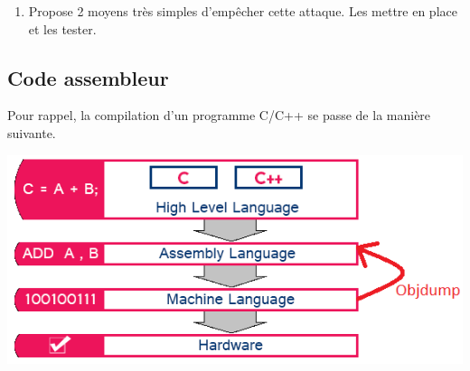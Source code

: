 \documentclass[french, 12pt]{article}%
\newcommand{\itemE}{\item[$\bullet$]}
\newif\ifPROF
\begin{document}
\ifPROF
\color{red}
\paragraph{Correction }

Il faut mettre 10 caratéres inutiles dans le login les 4 octets suivants vont écraser la varaible authentification. Attention à l'ordre des octets

\begin{lstlisting}[style=commande]
$ echo $(printf 'pppppppppp\x01\x00\x00\x00')>data_input.txt

(gdb)  run < data_input.txt
\end{lstlisting}

\normalcolor
\fi


\begin{enumerate}[resume]
\item Propose 2 moyens très simples d'empêcher cette attaque. Les mettre en place et les tester.
\end{enumerate}

\ifPROF
\color{red}
\paragraph{Correction }
\begin{itemize}
\itemE Utiliser des std::string car c'est le programme qui gère sa mémoire.
\itemE Changer l'ordre des variables. 
\itemE Utiliser des fonctions qui permettent de vérifier la taille 
\begin{lstlisting}[style=commande]
std::cin >> std::setw(10) >> login;
std::cin >> std::setw(10) >> mdp;}
\end{lstlisting}

\end{itemize}
\normalcolor
\fi


\subsection{Code assembleur}

Pour rappel, la compilation d'un programme C/C++ se passe de la manière suivante. 
\begin{center}
\includegraphics[scale=0.7]{./ressource/objdump.png}
\end{center}
\end{document}
